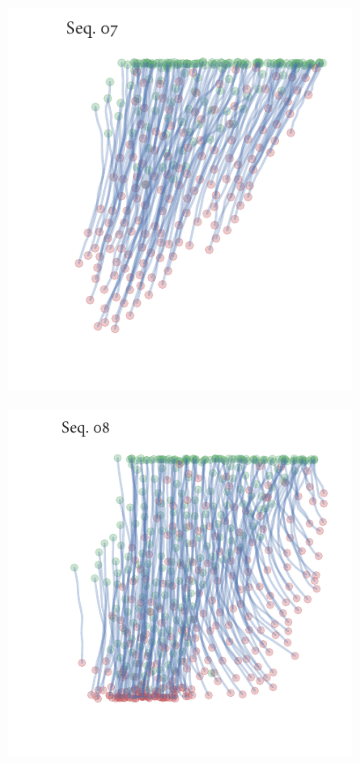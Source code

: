 \begin{figure}[h]
	\begin{subfigure}[t]{0.5\textwidth}
		\centering
		\includegraphics{streamline_sequence07.pdf}
	\end{subfigure}%
	\begin{subfigure}[t]{0.5\textwidth}
		\centering
		\includegraphics{streamline_sequence08.pdf}
	\end{subfigure}
	\begin{subfigure}[t]{0.5\textwidth}

\end{subfigure}
\end{figure}
